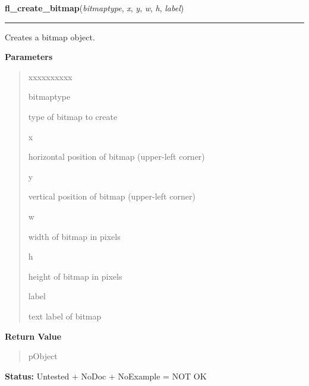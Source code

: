     \label{xformslib:library:fl_create_bitmap}

    \vspace{0.5ex}

\hspace{.8\funcindent}\begin{boxedminipage}{\funcwidth}

    \raggedright \textbf{fl\_create\_bitmap}(\textit{bitmaptype}, \textit{x}, \textit{y}, \textit{w}, \textit{h}, \textit{label})

    \vspace{-1.5ex}

    \rule{\textwidth}{0.5\fboxrule}
\setlength{\parskip}{2ex}
    Creates a bitmap object.

\setlength{\parskip}{1ex}
      \textbf{Parameters}
      \vspace{-1ex}

      \begin{quote}
        \begin{Ventry}{xxxxxxxxxx}

          \item[bitmaptype]

          type of bitmap to create

          \item[x]

          horizontal position of bitmap (upper-left corner)

          \item[y]

          vertical position of bitmap (upper-left corner)

          \item[w]

          width of bitmap in pixels

          \item[h]

          height of bitmap in pixels

          \item[label]

          text label of bitmap

        \end{Ventry}

      \end{quote}

      \textbf{Return Value}
    \vspace{-1ex}

      \begin{quote}
      pObject

      \end{quote}

\textbf{Status:} Untested + NoDoc + NoExample = NOT OK



    \end{boxedminipage}


